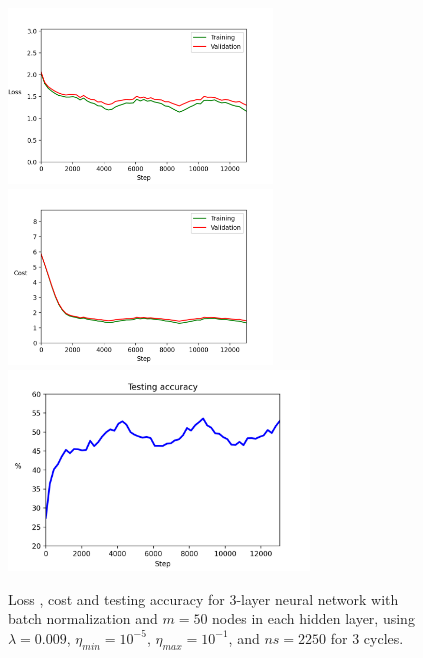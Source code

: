 \documentclass{article}
\begin{document}
	\begin{figure}[h!]
		\centering
		\includegraphics[width=7cm]{../plots/loss_lambdaOptimal.png}
		\includegraphics[width=7cm]{../plots/cost_lambdaOptimal.png}
		\includegraphics[width=8cm]{../plots/acc_lambdaOptimal.png}
		\caption{Loss , cost and testing accuracy for $3$-layer neural network with batch normalization and $m = 50$ nodes in each hidden layer, using $\lambda=0.009$, $\eta_{min}=10^{-5}$,  $\eta_{max}=10^{-1}$, and $ns = 2250$ for $3$ cycles.}
 	\end{figure}

\newpage
\end{document}
